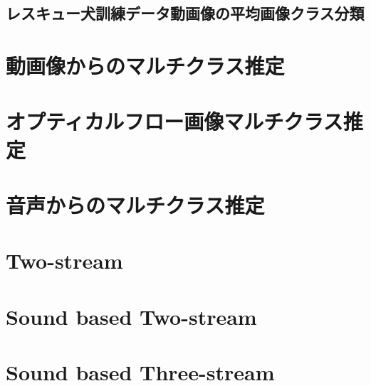 \subsection{レスキュー犬訓練データ動画像の平均画像クラス分類}

\section{動画像からのマルチクラス推定}

\section{オプティカルフロー画像マルチクラス推定}


\section{音声からのマルチクラス推定}
\section{Two-stream}
\section{Sound based Two-stream}
\section{Sound based Three-stream}

